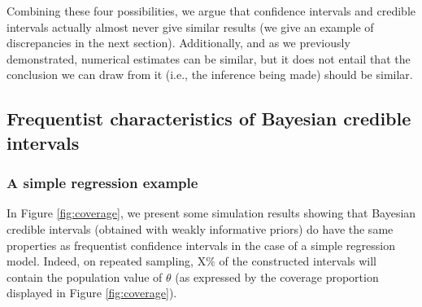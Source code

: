 \documentclass[a4paper,man,natbib,floatsintext,donotrepeattitle]{apa6}
\begin{document}
Combining these four possibilities, we argue that confidence intervals and credible intervals actually almost never give similar results (we give an example of discrepancies in the next section). Additionally, and as we previously demonstrated, numerical estimates can be similar, but it does not entail that the conclusion we can draw from it (i.e., the inference being made) should be similar.




\subsection{Frequentist characteristics of Bayesian credible intervals}

\subsubsection{A simple regression example}

In Figure \ref{fig:coverage}, we present some simulation results showing that Bayesian credible intervals (obtained with weakly informative priors) do have the same properties as frequentist confidence intervals in the case of a simple regression model. Indeed, on repeated sampling, X\% of the constructed intervals will contain the population value of $\theta$ (as expressed by the coverage proportion displayed in Figure \ref{fig:coverage}).
\end{document}
